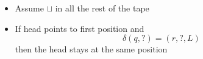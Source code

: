 \begin{frame}[allowframebreaks]
\begin{itemize}
\item [] Assume $\sqcup$ in all the rest of the tape
\item If head points to first position and
    \begin{equation*}
  \delta(q,?) = (r,?,L)
\end{equation*}
then the head stays at the same position
\begin{center}
\end{center}

\end{itemize}\end{frame}


